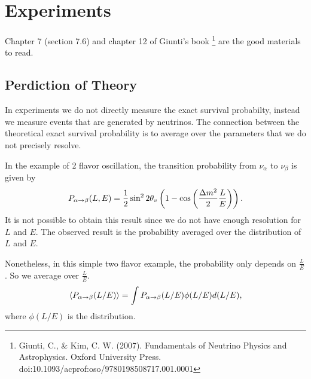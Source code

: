 \documentclass[letterpaper,12pt,english]{sphinxmanual}
\begin{document}
\chapter{Experiments}
\label{experiments:experiments}\label{experiments::doc}
Chapter 7 (section 7.6) and chapter 12 of Giunti's book \footnote{
Giunti, C., \& Kim, C. W. (2007). Fundamentals of Neutrino Physics and Astrophysics. Oxford University Press. doi:10.1093/acprof:oso/9780198508717.001.0001
} are the good materials to read.


\section{Perdiction of Theory}
\label{experiments:index-0}\label{experiments:perdiction-of-theory}
In experiments we do not directly measure the exact survival probabilty, instead we measure events that are generated by neutrinos. The connection between the theoretical exact survival probability is to average over the parameters that we do not precisely resolve.

In the example of 2 flavor oscillation, the transition probability from \(\nu_\alpha\) to \(\nu_\beta\) is given by
\begin{gather}
\begin{split}P_{\alpha\to\beta}(L,E) = \frac{1}{2}\sin^2 2\theta_v\left( 1 - \cos\left( \frac{\Delta m^2}{2}\frac{L}{E} \right) \right).\end{split}\notag
\end{gather}
It is not possible to obtain this result since we do not have enough resolution for \(L\) and \(E\). The observed result is the probability averaged over the distribution of \(L\) and \(E\). \footnotemark[1]

Nonetheless, in this simple two flavor example, the probability only depends on \(\frac{L}{E}\). So we average over \(\frac{L}{E}\). \footnotemark[1]
\begin{gather}
\begin{split}\langle P_{\alpha\to\beta}(L/E) \rangle = \int P_{\alpha\to\beta}(L/E) \phi(L/E) d(L/E),\end{split}\notag
\end{gather}
where \(\phi(L/E)\) is the distribution.
\end{document}
